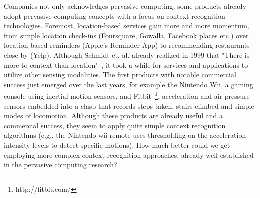 

Companies not only acknowledges pervasive computing, some products already 
adopt pervasive computing concepts with a focus on context recognition technologies. Foremost, location-based services gain more and more momentum, from simple location check-ins (Foursquare, Gowalla, Facebook places etc.) over location-based reminders (Apple's Reminder App) to recommending restaurants close by (Yelp). 
Although Schmidt et. al. already realized in 1999 that "There is more to context than location"~\cite{Schmidt:1999hn}, it took a while for services and applications to utilize other sensing modalities. The first products with notable commercial success just emerged over the last years, for example the Nintendo Wii, a gaming console using inertial motion sensors, and Fitbit~\footnote{http://fitbit.com/}, acceleration and air-pressure sensors embedded into a clasp that records steps taken, stairs climbed and simple modes of locomotion. Although these products are already useful and a commercial success, they seem to apply quite simple context recognition algorithms (e.g., the Nintendo wii remote uses thresholding on the acceleration intensity levels to detect specific motions). How much better could we get employing more complex context recognition approaches, already well established in the pervasive computing research?


